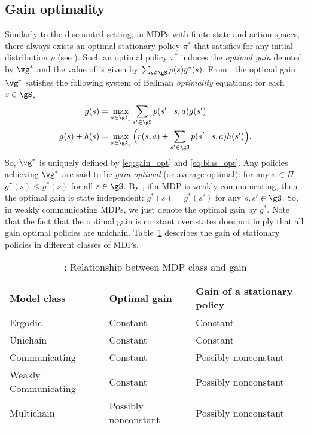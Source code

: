 \subsection{Gain optimality}
\label{ch:mdp:ssec:gain}

Similarly to the discounted setting, in MDPs with finite state and action spaces, there always exists an optimal stationary policy $\pi^*$ that satisfies  for any initial distribution $\rho$ (see \cite[Theorem~9.1.8]{puterman2014markov}).
Such an optimal policy $\pi^*$ induces the \emph{optimal gain} denoted by $\vg^*$ and the value of  is given by $\sum_{s\in\gS} \rho(s)g^*(s)$.
From \cite[Chapter~9]{puterman2014markov}, the optimal gain $\vg^*$ satisfies the following system of Bellman \emph{optimality} equations: for each $s\in\gS$,
\begin{align}
    g(s) &= \max_{a\in\gA_s} \sum_{s'\in\gS}p(s'\mid s,a)g(s') \label{eq:gain_opt} \\
    g(s) +h(s) &= \max_{a\in\gA_s}\Big(r(s,a) +\sum_{s'\in\gS}p(s'\mid s,a)h(s')\Big) \label{eq:bias_opt}.
\end{align}
So, $\vg^*$ is uniquely defined by \eqref{eq:gain_opt} and \eqref{eq:bias_opt}.
Any policies achieving $\vg^*$ are said to be \emph{gain optimal} (or average optimal): for any $\pi\in\Pi$, $g^\pi(s)\le g^*(s)$ for all $s\in\gS$.
By \cite[Theorem~8.3.2]{puterman2014markov}, if a MDP is weakly communicating, then the optimal gain is state independent: $g^*(s)=g^*(s')$ for any $s,s'\in\gS$.
So, in weakly communicating MDPs, we just denote the optimal gain by $g^*$.
Note that the fact that the optimal gain is constant over states does not imply that all gain optimal policies are unichain.
Table~\ref{tab:mdp_vs_gain} describes the gain of stationary policies in different classes of MDPs.
\begin{table}[ht]
    \begin{tabular}{lll}
        \hline
        Model class          & Optimal gain         & Gain of a stationary policy \\ \hline
        Ergodic              & Constant             & Constant                    \\
        Unichain             & Constant             & Constant                    \\
        Communicating        & Constant             & Possibly nonconstant        \\
        Weakly Communicating & Constant             & Possibly nonconstant        \\
        Multichain           & Possibly nonconstant & Possibly nonconstant       \\ \hline
    \end{tabular}
    \caption{\cite[Table~8.3.1]{puterman2014markov}: Relationship between MDP class and gain}
    \label{tab:mdp_vs_gain}
\end{table}
